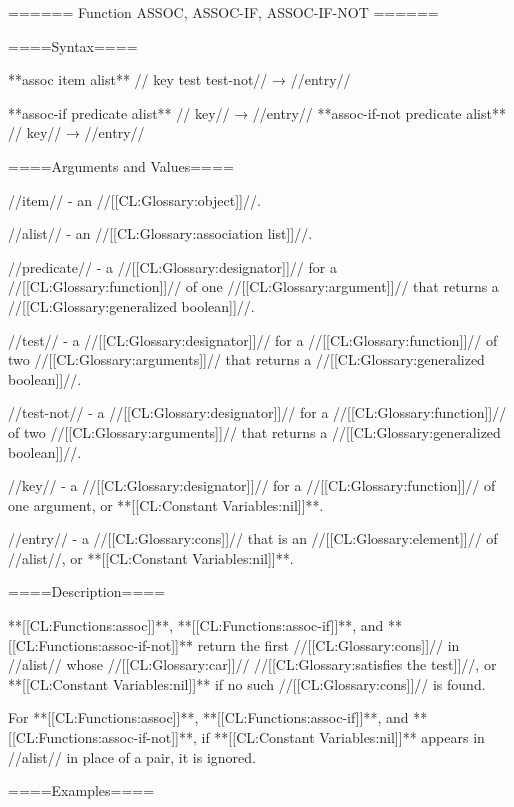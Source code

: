 ====== Function ASSOC, ASSOC-IF, ASSOC-IF-NOT ======

====Syntax====

**assoc {item alist** //\key} key test test-not// → //entry//

**assoc-if {predicate alist** //\key} key// → //entry// **assoc-if-not {predicate alist** //\key} key// → //entry//

====Arguments and Values====

//item// - an //[[CL:Glossary:object]]//.

//alist// - an //[[CL:Glossary:association list]]//.

//predicate// - a //[[CL:Glossary:designator]]// for a //[[CL:Glossary:function]]// of one //[[CL:Glossary:argument]]// that returns a //[[CL:Glossary:generalized boolean]]//.

//test// - a //[[CL:Glossary:designator]]// for a //[[CL:Glossary:function]]// of two //[[CL:Glossary:arguments]]// that returns a //[[CL:Glossary:generalized boolean]]//.

//test-not// - a //[[CL:Glossary:designator]]// for a //[[CL:Glossary:function]]// of two //[[CL:Glossary:arguments]]// that returns a //[[CL:Glossary:generalized boolean]]//.

//key// - a //[[CL:Glossary:designator]]// for a //[[CL:Glossary:function]]// of one argument, or **[[CL:Constant Variables:nil]]**.

//entry// - a //[[CL:Glossary:cons]]// that is an //[[CL:Glossary:element]]// of //alist//, or **[[CL:Constant Variables:nil]]**.

====Description====

**[[CL:Functions:assoc]]**, **[[CL:Functions:assoc-if]]**, and **[[CL:Functions:assoc-if-not]]** return the first //[[CL:Glossary:cons]]// in //alist// whose //[[CL:Glossary:car]]// //[[CL:Glossary:satisfies the test]]//, or **[[CL:Constant Variables:nil]]** if no such //[[CL:Glossary:cons]]// is found.


For **[[CL:Functions:assoc]]**, **[[CL:Functions:assoc-if]]**, and **[[CL:Functions:assoc-if-not]]**, if **[[CL:Constant Variables:nil]]** appears in //alist// in place of a pair, it is ignored.

====Examples====

